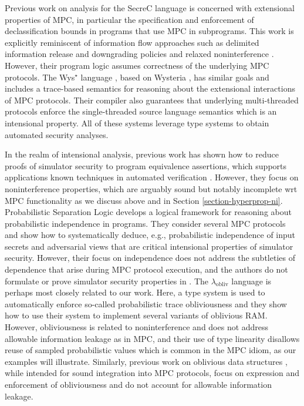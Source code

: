 Previous work on analysis for the SecreC language
\cite{almeida2018enforcing,10.1145/2637113.2637119} is concerned with
extensional properties of MPC, in particular the specification and
enforcement of declassification bounds in programs that use MPC in
subprograms. This work is explicitly reminiscent of information flow
approaches such as delimited information release
\cite{10.1007/978-3-540-37621-7_9} and downgrading policies and
relaxed noninterference \cite{10.1145/1040305.1040319}. However, their
program logic assumes correctness of the underlying MPC protocols.
The Wys$^\star$ language \cite{wysstar}, based on Wysteria
\cite{rastogi2014wysteria}, has similar goals and includes a
trace-based semantics for reasoning about the extensional interactions
of MPC protocols. Their compiler also guarantees that underlying
multi-threaded protocols enforce the single-threaded source language
semantics which is an intensional property. All of these systems
leverage type systems to obtain automated security analyses.

In the realm of intensional analysis, previous work has shown how to
reduce proofs of simulator security to program equivalence assertions,
which supports applications known techniques in automated verification
\cite{8429300}. However, they focus on noninterference properties,
which are arguably sound but notably incomplete wrt MPC functionality
as we discuss above and in Section
\ref{section-hyperprop-ni}. Probabilistic Separation Logic
\cite{barthe2019probabilistic} develops a logical framework for
reasoning about probabilistic independence in programs.  They consider
several MPC protocols and show how to systematically deduce, e.g.,
probabilistic independence of input secrets and adversarial views that
are critical intensional properties of simulator security.  However,
their focus on independence does not address the subtleties of
dependence that arise during MPC protocol execution, and the authors
do not formulate or prove simulator security properties in
\cite{barthe2019probabilistic}. The $\lambda_{\mathrm{obliv}}$
language \cite{darais2019language} is perhaps most closely related to
our work. Here, a type system is used to automatically enforce
so-called probabilistic trace obliviousness and they show how to use
their system to implement several variants of oblivious RAM. However,
obliviousness is related to noninterference and does not address
allowable information leakage as in MPC, and their use of type
linearity disallows reuse of sampled probabilistic values which is
common in the MPC idiom, as our examples will illustrate. Similarly,
previous work on oblivious data structures \cite{10.1145/3498713},
while intended for sound integration into MPC protocols, focus on
expression and enforcement of obliviousness and do not account
for allowable information leakage.

